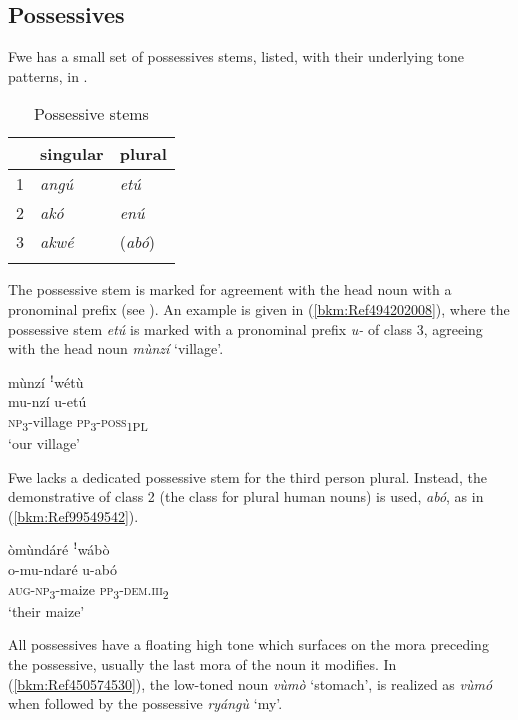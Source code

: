 \subsection{Possessives}
\label{bkm:Ref491333327}\hypertarget{Toc75352650}{}\label{bkm:Ref451868043}
Fwe has a small set of possessives stems, listed, with their underlying tone patterns, in .

\begin{table}
\label{bkm:Ref463366816}\caption{\label{tab:4:21}Possessive stems}

\begin{tabular}{lll}
\lsptoprule
& singular & plural\\
\midrule
1 & \textit{angú} & {\itshape etú}\\
2 & \textit{akó} & {\itshape enú}\\
3 & {\itshape akwé} & (\textit{abó})\\
\lspbottomrule
\end{tabular}
\end{table}

The possessive stem is marked for agreement with the head noun with a pronominal prefix (see ). An example is given in (\ref{bkm:Ref494202008}), where the possessive stem \textit{etú} is marked with a pronominal prefix \textit{u-} of class 3, agreeing with the head noun \textit{mùnzí} ‘village’.

\ea
\label{bkm:Ref494202008}
mùnzí ꜝwétù\\
\gll mu-nzí  u-etú\\
\textsc{np}\textsubscript{3}-village  \textsc{pp}\textsubscript{3}-\textsc{poss}\textsubscript{1PL\-}\\
\glt ‘our village’
\z

Fwe lacks a dedicated possessive stem for the third person plural. Instead, the demonstrative of class 2 (the class for plural human nouns) is used, \textit{abó}, as in (\ref{bkm:Ref99549542}).

\ea
\label{bkm:Ref99549542}
òmùndáré ꜝwábò\\
\gll o-mu-ndaré  u-abó\\
\textsc{aug}\--\textsc{np}\textsubscript{3}-maize  \textsc{pp}\textsubscript{3}-\textsc{dem}.\textsc{iii}\textsubscript{2}\\
\glt ‘their maize’
\z

All possessives have a floating high tone which surfaces on the mora preceding the possessive, usually the last mora of the noun it modifies. In (\ref{bkm:Ref450574530}), the low-toned noun \textit{vùmò} ‘stomach’, is realized as \textit{vùmó} when followed by the possessive \textit{ryángù} ‘my’.

